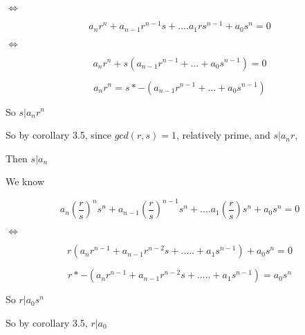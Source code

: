\documentclass[11pt]{article}
\begin{document}
\begin{itemize}
  $\iff$

  $$a_n r^n + a_{n-1} r^{n-1} s + .... a_1 r s^{n-1} + a_0 s^n = 0$$

  $\iff$

  $$a_n r^n + s(a_{n-1} r^{n-1} + ... + a_0 s^{n-1}) = 0$$

  $$a_n r^n = s * -(a_{n-1} r^{n-1} + ... + a_0 s^{n-1})$$

  So $s | a_n r^n$

  So by corollary 3.5, since $gcd(r,s) = 1$, relatively prime, and $s | a_n r$,

  Then $s | a_n$

  We know

  $$a_n(\frac{r}{s})^n s^n + a_{n-1}(\frac{r}{s})^{n-1} s^n + .... a_1 (\frac{r}{s}) s^n + a_0 s^n = 0$$

  $\iff$

  $$r(a_n r^{n-1} + a_{n-1} r^{n-2} s + ..... + a_1s^{n-1}) + a_0 s^n = 0$$


  $$r * -(a_n r^{n-1} + a_{n-1} r^{n-2} s + ..... + a_1s^{n-1}) = a_0 s^n$$

  So $r | a_0 s^n$

  So by corollary 3.5, $r | a_0$
\end{itemize}
\end{document}
